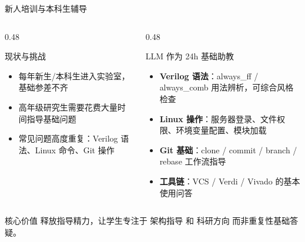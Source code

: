 \documentclass[aspectratio=169, 10pt, UTF8]{ctexbeamer}
\begin{document}
\begin{frame}{新人培训与本科生辅导}
  \begin{columns}[T]
    \begin{column}{0.48\textwidth}
      \begin{block}{现状与挑战}
        \begin{itemize}
          \item 每年新生/本科生进入实验室，基础参差不齐
          \item 高年级研究生需要花费大量时间指导基础问题
          \item 常见问题高度重复：Verilog 语法、Linux 命令、Git 操作
        \end{itemize}
      \end{block}
    \end{column}
    \begin{column}{0.48\textwidth}
      \begin{exampleblock}{LLM 作为 24h 基础助教}
        \begin{itemize}
          \item \textbf{Verilog 语法}：always\_ff / always\_comb 用法辨析，可综合风格检查
          \item \textbf{Linux 操作}：服务器登录、文件权限、环境变量配置、模块加载
          \item \textbf{Git 基础}：clone / commit / branch / rebase 工作流指导
          \item \textbf{工具链}：VCS / Verdi / Vivado 的基本使用问答
        \end{itemize}
      \end{exampleblock}
    \end{column}
  \end{columns}

  \vspace{6pt}
  \begin{alertblock}{核心价值}
    释放指导精力，让学生专注于 \alert{架构指导} 和 \alert{科研方向} 而非重复性基础答疑。
  \end{alertblock}
\end{frame}
\end{document}
